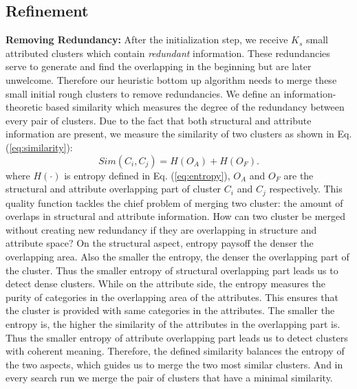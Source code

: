 \subsection{Refinement}
\noindent \textbf{Removing Redundancy:} After the initialization step, we receive $K_s$ small attributed clusters which contain \emph{redundant} information. These redundancies serve to generate and find the overlapping in the beginning but are later unwelcome. Therefore our heuristic bottom up algorithm needs to merge these small initial rough clusters to remove redundancies. We define an information-theoretic based similarity which measures the degree of the redundancy between every pair of clusters. Due to the fact that both structural and attribute information are present, we measure the similarity of two clusters as shown in Eq. (\ref{eq:similarity}):
\begin{equation}
Sim(C_i,C_j) = H(O_A)+ H(O_F).
\label{eq:similarity}
\end{equation}
where $H(\cdot)$ is entropy defined in Eq. (\ref{eq:entropy}), $O_A$ and $O_F$ are the structural and attribute overlapping part of cluster $C_i$ and $C_j$ respectively. This quality function tackles the chief problem of merging two cluster: the amount of overlaps in structural and attribute information. How can two cluster be merged without creating new redundancy if they are overlapping in structure and attribute space? On the structural aspect, entropy paysoff the denser the overlapping area. Also the smaller the entropy, the denser the overlapping part of the cluster. Thus the smaller entropy of structural overlapping part leads us to detect dense clusters. While on the attribute side, the entropy measures the purity of categories in the overlapping area of the attributes. This ensures that the cluster is provided with same categories in the attributes. The smaller the entropy is, the higher the similarity of the attributes in the overlapping part is. Thus the smaller entropy of  attribute overlapping part leads us to detect clusters with coherent meaning. Therefore, the defined similarity balances the entropy of the two aspects, which guides us to merge the two most similar clusters. And in every search run we merge the pair of clusters that have a minimal similarity.
\\

